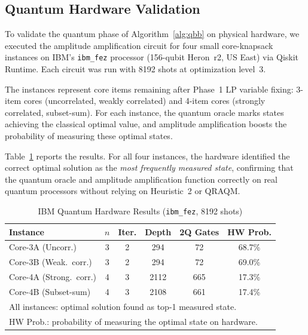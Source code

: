 
\subsection{Quantum Hardware Validation}

To validate the quantum phase of Algorithm~\ref{alg:qbb} on physical hardware, we executed the amplitude amplification circuit for four small core-knapsack instances on IBM's \texttt{ibm\_fez} processor (156-qubit Heron~r2, US East) via Qiskit Runtime. Each circuit was run with 8192 shots at optimization level~3.

The instances represent core items remaining after Phase~1 LP variable fixing: 3-item cores (uncorrelated, weakly correlated) and 4-item cores (strongly correlated, subset-sum). For each instance, the quantum oracle marks states achieving the classical optimal value, and amplitude amplification boosts the probability of measuring these optimal states.

Table~\ref{tab:hardware} reports the results. For all four instances, the hardware identified the correct optimal solution as the \textit{most frequently measured state}, confirming that the quantum oracle and amplitude amplification function correctly on real quantum processors without relying on Heuristic~2 or QRAQM.

\begin{table}[htbp]
\caption{IBM Quantum Hardware Results (\texttt{ibm\_fez}, 8192 shots)}
\label{tab:hardware}
\begin{center}
\begin{tabular}{lccccc}
\toprule
\textbf{Instance} & $n$ & \textbf{Iter.} & \textbf{Depth} & \textbf{2Q Gates} & \textbf{HW Prob.} \\
\midrule
Core-3A (Uncorr.) & 3 & 2 & 294 & 72 & 68.7\% \\
Core-3B (Weak.~corr.) & 3 & 2 & 294 & 72 & 69.0\% \\
Core-4A (Strong.~corr.) & 4 & 3 & 2112 & 665 & 17.3\% \\
Core-4B (Subset-sum) & 4 & 3 & 2108 & 661 & 17.4\% \\
\bottomrule
\multicolumn{6}{l}{\footnotesize All instances: optimal solution found as top-1 measured state.} \\
\multicolumn{6}{l}{\footnotesize HW Prob.: probability of measuring the optimal state on hardware.}
\end{tabular}
\end{center}
\end{table}

